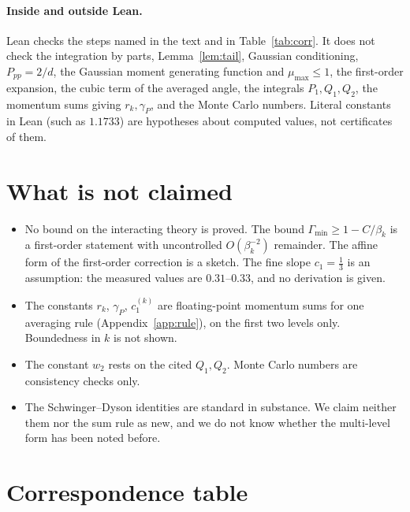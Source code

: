 \documentclass[11pt,a4paper]{article}
\theoremstyle{definition}
\theoremstyle{remark}
\begin{document}
\paragraph{Inside and outside Lean.} Lean checks the steps named in the text and in Table~\ref{tab:corr}. It does not check the integration by parts, Lemma~\ref{lem:tail}, Gaussian conditioning, $P_{pp}=2/d$, the Gaussian moment generating function and $\mu_{\max}\le1$, the first-order expansion, the cubic term of the averaged angle, the integrals $P_1,Q_1,Q_2$, the momentum sums giving $r_k,\gamma_P$, and the Monte Carlo numbers. Literal constants in Lean (such as $1.1733$) are hypotheses about computed values, not certificates of them.

\section{What is not claimed}\label{sec:notclaimed}
\begin{itemize}[leftmargin=1.5em,itemsep=1pt,topsep=2pt]
\item No bound on the interacting theory is proved. The bound $\Gamma_{\min}\ge1-C/\beta_k$ is a first-order statement with uncontrolled $O(\beta_k^{-2})$ remainder. The affine form of the first-order correction is a sketch. The fine slope $c_1=\frac13$ is an assumption: the measured values are $0.31$--$0.33$, and no derivation is given.
\item The constants $r_k$, $\gamma_P$, $c_1^{(k)}$ are floating-point momentum sums for one averaging rule (Appendix~\ref{app:rule}), on the first two levels only. Boundedness in $k$ is not shown.
\item The constant $w_2$ rests on the cited $Q_1,Q_2$. Monte Carlo numbers are consistency checks only.
\item The Schwinger--Dyson identities are standard in substance. We claim neither them nor the sum rule as new, and we do not know whether the multi-level form has been noted before.
\end{itemize}

\section{Correspondence table}\label{sec:corr}
\end{document}
